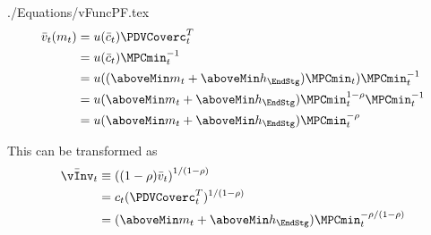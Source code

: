 \documentclass[SolvingMicroDSOPs]{subfiles}
\begin{document}
\begin{verbatimwrite}{./Equations/vFuncPF.tex}
  \begin{equation}\begin{gathered}\begin{aligned}
        \bar{\vFunc}_{\prd}(m_{\prd})  & = \uFunc(\bar{\cNrm}_{\prd})\PDVCoverc_{\prd}^{T}\label{eq:vFuncPF}
        \\  & = \uFunc(\bar{c}_{\prd}) \MPCmin_{\prd}^{-1} %
        \\  & = \uFunc((\aboveMin \mNrm_{\prd}+\aboveMin \hNrm_{\EndStg})\MPCmin_{\prd}) \MPCmin_{\prd}^{-1} %
        \\  & = \uFunc(\aboveMin \mNrm_{\prd}+\aboveMin \hNrm_{\EndStg})\MPCmin_{\prd}^{1-\CRRA} \MPCmin_{\prd}^{-1} %
        \\  & = \uFunc(\aboveMin \mNrm_{\prd}+\aboveMin \hNrm_{\EndStg})\MPCmin_{\prd}^{-\CRRA}  %
      \end{aligned}\end{gathered}\end{equation}

  This can be transformed as
  \begin{equation*}\begin{gathered}\begin{aligned}
        \bar{\vInv}_{\prd}  & \equiv  \left((1-\CRRA)\bar{\vFunc}_{\prd}\right)^{1/(1-\CRRA)}
        \\  & = \cNrm_{\prd}(\PDVCoverc_{\prd}^{T})^{1/(1-\CRRA)}
        \\  & = (\aboveMin \mNrm_{\prd}+\aboveMin \hNrm_{\EndStg})\MPCmin_{\prd}^{-\CRRA/(1-\CRRA)}   %
      \end{aligned}\end{gathered}\end{equation*}
\end{verbatimwrite}
\unskip
\end{document}
